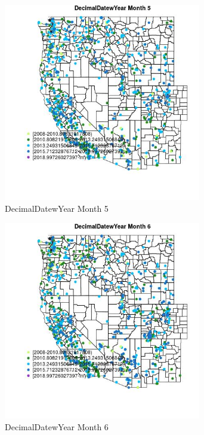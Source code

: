 \begin{figure} 
\centering  
\includegraphics[width=0.77\textwidth]{Code_Outputs/Report_ML_input_PM25_Step4_part_e_de_duplicated_aveswNAs_MapObsMo5DecimalDatewYear.jpg} 
\caption{\label{fig:Report_ML_input_PM25_Step4_part_e_de_duplicated_aveswNAsMapObsMo5DecimalDatewYear}DecimalDatewYear Month 5} 
\end{figure} 
 

\begin{figure} 
\centering  
\includegraphics[width=0.77\textwidth]{Code_Outputs/Report_ML_input_PM25_Step4_part_e_de_duplicated_aveswNAs_MapObsMo6DecimalDatewYear.jpg} 
\caption{\label{fig:Report_ML_input_PM25_Step4_part_e_de_duplicated_aveswNAsMapObsMo6DecimalDatewYear}DecimalDatewYear Month 6} 
\end{figure} 
 

